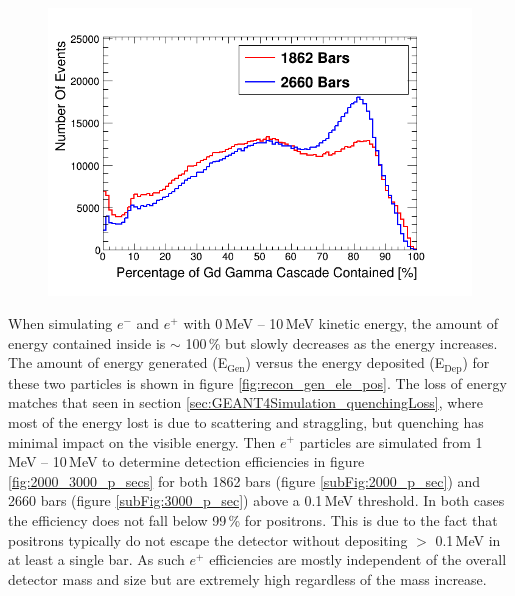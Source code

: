 \begin{figure}[!h]
 \centering
 \includegraphics[width=0.7\linewidth]{Chapter4/Figs/cascadeContainmentCompare.png}
 \label{fig:containment_comparison}
\end{figure} 

When simulating $e^-$ and $e^+$ with 0\,MeV -- 10\,MeV kinetic energy, the amount of energy contained inside is $\sim$ 100\,\% but slowly decreases as the energy increases. The amount of energy generated (E$_\textrm{{Gen}}$) versus the energy deposited  (E$_\textrm{{Dep}}$) for these two particles is shown in figure \ref{fig:recon_gen_ele_pos}. The loss of energy matches that seen in section \ref{sec:GEANT4Simulation_quenchingLoss}, where most of the energy lost is due to scattering and straggling, but quenching has minimal impact on the visible energy. Then $e^+$ particles are simulated from 1\,MeV -- 10\,MeV to determine detection efficiencies in figure \ref{fig:2000_3000_p_secs} for both 1862 bars (figure \ref{subFig:2000_p_sec}) and 2660 bars (figure \ref{subFig:3000_p_sec}) above a 0.1\,MeV threshold. In both cases the efficiency does not fall below 99\,\% for positrons. This is due to the fact that positrons typically do not escape the detector without depositing $>$ 0.1\,MeV in at least a single bar. As such $e^+$ efficiencies are mostly independent of the overall detector mass and size but are extremely high regardless of the mass increase.  

